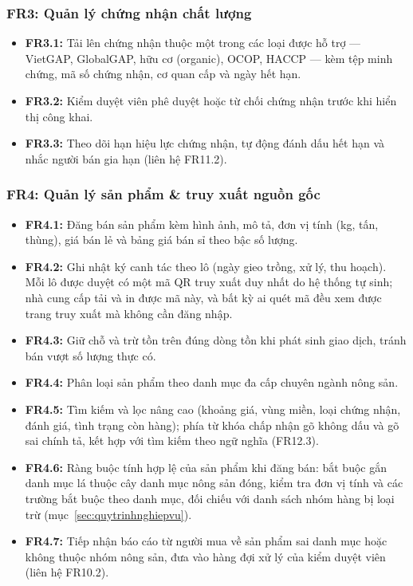 \subsubsection*{FR3: Quản lý chứng nhận chất lượng}
\begin{itemize}
    \item \textbf{FR3.1:} Tải lên chứng nhận thuộc một trong các loại được
    hỗ trợ --- VietGAP, GlobalGAP, hữu cơ (organic), OCOP, HACCP --- kèm tệp
    minh chứng, mã số chứng nhận, cơ quan cấp và ngày hết hạn.
    \item \textbf{FR3.2:} Kiểm duyệt viên phê duyệt hoặc từ chối
    chứng nhận trước khi hiển thị công khai.
    \item \textbf{FR3.3:} Theo dõi hạn hiệu lực chứng nhận, tự động đánh dấu
    hết hạn và nhắc người bán gia hạn (liên hệ FR11.2).
\end{itemize}

\subsubsection*{FR4: Quản lý sản phẩm \& truy xuất nguồn gốc}
\begin{itemize}
    \item \textbf{FR4.1:} Đăng bán sản phẩm kèm hình ảnh, mô tả, đơn vị
    tính (kg, tấn, thùng), giá bán lẻ và bảng giá bán sỉ theo bậc số lượng.
    \item \textbf{FR4.2:} Ghi nhật ký canh tác theo lô (ngày gieo trồng, xử
    lý, thu hoạch). Mỗi lô được duyệt có một mã QR truy xuất duy nhất do hệ
    thống tự sinh; nhà cung cấp tải và in được mã này, và bất kỳ ai quét mã
    đều xem được trang truy xuất mà không cần đăng nhập.
    \item \textbf{FR4.3:} Giữ chỗ và trừ tồn trên đúng dòng tồn khi phát
    sinh giao dịch, tránh bán vượt số lượng thực có.
    \item \textbf{FR4.4:} Phân loại sản phẩm theo danh mục đa cấp chuyên
    ngành nông sản.
    \item \textbf{FR4.5:} Tìm kiếm và lọc nâng cao (khoảng giá, vùng miền,
    loại chứng nhận, đánh giá, tình trạng còn hàng); phía từ khóa chấp nhận
    gõ không dấu và gõ sai chính tả, kết hợp với tìm kiếm theo ngữ nghĩa
    (FR12.3).
    \item \textbf{FR4.6:} Ràng buộc tính hợp lệ của sản phẩm khi đăng bán:
    bắt buộc gắn danh mục lá thuộc cây danh mục nông sản đóng, kiểm tra đơn
    vị tính và các trường bắt buộc theo danh mục, đối chiếu với danh sách
    nhóm hàng bị loại trừ (mục~\ref{sec:quytrinhnghiepvu}).
    \item \textbf{FR4.7:} Tiếp nhận báo cáo từ người mua về sản phẩm sai
    danh mục hoặc không thuộc nhóm nông sản, đưa vào hàng đợi xử lý của
    kiểm duyệt viên (liên hệ FR10.2).
\end{itemize}

